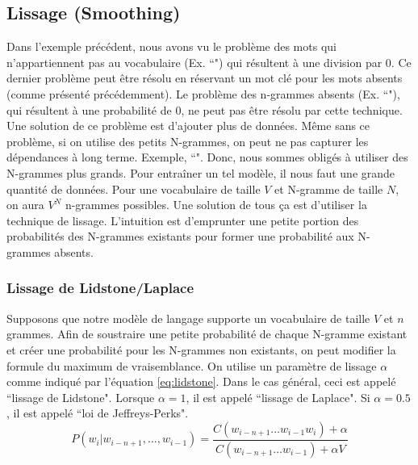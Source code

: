 \documentclass{KodeBook}
\begin{document}
\subsection{Lissage (Smoothing)}

Dans l'exemple précédent, nous avons vu le problème des mots qui n'appartiennent pas au vocabulaire (Ex. ``") qui résultent à une division par $0$. 
Ce dernier problème peut être résolu en réservant un mot clé pour les mots absents (comme présenté précédemment).
Le problème des n-grammes absents (Ex. ``"), qui résultent à une probabilité de $0$, ne peut pas être résolu par cette technique. 
Une solution de ce problème est d'ajouter plus de données.
Même sans ce problème, si on utilise des petits N-grammes, on peut ne pas capturer les dépendances à long terme. 
Exemple, ``". 
Donc, nous sommes obligés à utiliser des N-grammes plus grands. 
Pour entraîner un tel modèle, il nous faut une grande quantité de données. 
Pour une vocabulaire de taille $V$ et N-gramme de taille $N$, on aura $V^N$ n-grammes possibles.
Une solution de tous ça est d'utiliser la technique de lissage.
L'intuition est d'emprunter une petite portion des probabilités des N-grammes existants pour former une probabilité aux N-grammes absents.

\subsubsection{Lissage de Lidstone/Laplace}

Supposons que notre modèle de langage supporte un vocabulaire de taille $V$ et $n$ grammes.
Afin de soustraire une petite probabilité de chaque N-gramme existant et créer une probabilité pour les N-grammes non existants, on peut modifier la formule du maximum de vraisemblance.
On utilise un paramètre de lissage $\alpha$ comme indiqué par l'équation \ref{eq:lidstone}.
Dans le cas général, ceci est appelé ``lissage de Lidstone". 
Lorsque $\alpha = 1$, il est appelé ``lissage de Laplace". 
Si $\alpha = 0.5$, il est appelé ``loi de Jeffreys-Perks".
\begin{equation}
	P(w_i | w_{i-n+1}, \ldots, w_{i-1}) = \frac{C(w_{i-n+1} \ldots w_{i-1} w_i) + \alpha}{C(w_{i-n+1} \ldots w_{i-1}) + \alpha V}
	\label{eq:lidstone}
\end{equation}
\end{document}
